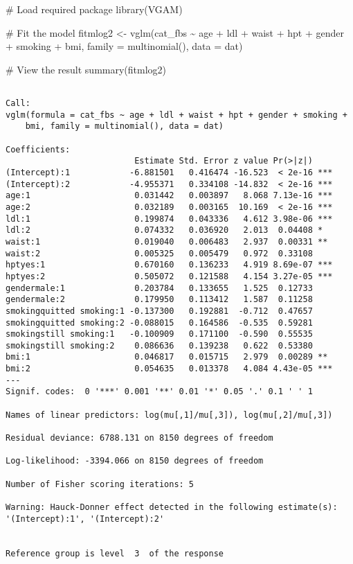 \documentclass[
  letterpaper,
  DIV=11,
  numbers=noendperiod]{scrartcl}
\newenvironment{Shaded}{\begin{snugshade}}{\end{snugshade}}
\newcommand{\AttributeTok}[1]{\textcolor[rgb]{0.40,0.45,0.13}{#1}}
\newcommand{\CommentTok}[1]{\textcolor[rgb]{0.37,0.37,0.37}{#1}}
\newcommand{\FunctionTok}[1]{\textcolor[rgb]{0.28,0.35,0.67}{#1}}
\newcommand{\NormalTok}[1]{\textcolor[rgb]{0.00,0.23,0.31}{#1}}
\newcommand{\OtherTok}[1]{\textcolor[rgb]{0.00,0.23,0.31}{#1}}
\newcommand{\SpecialCharTok}[1]{\textcolor[rgb]{0.37,0.37,0.37}{#1}}
\begin{document}
\begin{Shaded}
\begin{Highlighting}[]
\CommentTok{\# Load required package}
\FunctionTok{library}\NormalTok{(VGAM)}

\CommentTok{\# Fit the model}
\NormalTok{fitmlog2 }\OtherTok{\textless{}{-}} \FunctionTok{vglm}\NormalTok{(cat\_fbs }\SpecialCharTok{\textasciitilde{}}\NormalTok{ age }\SpecialCharTok{+}\NormalTok{ ldl }\SpecialCharTok{+}\NormalTok{ waist }\SpecialCharTok{+}\NormalTok{ hpt }\SpecialCharTok{+}\NormalTok{ gender }\SpecialCharTok{+}\NormalTok{ smoking }\SpecialCharTok{+}\NormalTok{ bmi,}
                 \AttributeTok{family =} \FunctionTok{multinomial}\NormalTok{(),}
                 \AttributeTok{data =}\NormalTok{ dat)}

\CommentTok{\# View the result}
\FunctionTok{summary}\NormalTok{(fitmlog2)}
\end{Highlighting}
\end{Shaded}

\begin{verbatim}

Call:
vglm(formula = cat_fbs ~ age + ldl + waist + hpt + gender + smoking + 
    bmi, family = multinomial(), data = dat)

Coefficients: 
                          Estimate Std. Error z value Pr(>|z|)    
(Intercept):1            -6.881501   0.416474 -16.523  < 2e-16 ***
(Intercept):2            -4.955371   0.334108 -14.832  < 2e-16 ***
age:1                     0.031442   0.003897   8.068 7.13e-16 ***
age:2                     0.032189   0.003165  10.169  < 2e-16 ***
ldl:1                     0.199874   0.043336   4.612 3.98e-06 ***
ldl:2                     0.074332   0.036920   2.013  0.04408 *  
waist:1                   0.019040   0.006483   2.937  0.00331 ** 
waist:2                   0.005325   0.005479   0.972  0.33108    
hptyes:1                  0.670160   0.136233   4.919 8.69e-07 ***
hptyes:2                  0.505072   0.121588   4.154 3.27e-05 ***
gendermale:1              0.203784   0.133655   1.525  0.12733    
gendermale:2              0.179950   0.113412   1.587  0.11258    
smokingquitted smoking:1 -0.137300   0.192881  -0.712  0.47657    
smokingquitted smoking:2 -0.088015   0.164586  -0.535  0.59281    
smokingstill smoking:1   -0.100909   0.171100  -0.590  0.55535    
smokingstill smoking:2    0.086636   0.139238   0.622  0.53380    
bmi:1                     0.046817   0.015715   2.979  0.00289 ** 
bmi:2                     0.054635   0.013378   4.084 4.43e-05 ***
---
Signif. codes:  0 '***' 0.001 '**' 0.01 '*' 0.05 '.' 0.1 ' ' 1

Names of linear predictors: log(mu[,1]/mu[,3]), log(mu[,2]/mu[,3])

Residual deviance: 6788.131 on 8150 degrees of freedom

Log-likelihood: -3394.066 on 8150 degrees of freedom

Number of Fisher scoring iterations: 5 

Warning: Hauck-Donner effect detected in the following estimate(s):
'(Intercept):1', '(Intercept):2'


Reference group is level  3  of the response
\end{verbatim}
\end{document}
